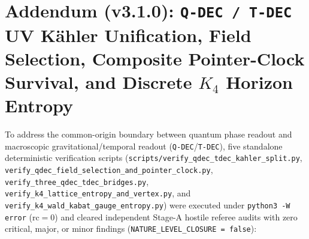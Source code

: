 \documentclass[11pt,a4paper]{article}
\begin{document}
\section{Addendum (v3.1.0): \texttt{Q-DEC / T-DEC} UV K\"ahler Unification, Field Selection, Composite Pointer-Clock Survival, and Discrete \texorpdfstring{$K_4$}{K4} Horizon Entropy}
\label{sec:v31-qdec-tdec}

To address the common-origin boundary between quantum phase readout and macroscopic gravitational/temporal readout (\texttt{Q-DEC}/\texttt{T-DEC}), five standalone deterministic verification scripts (\texttt{scripts/\allowbreak verify\_\allowbreak qdec\_\allowbreak tdec\_\allowbreak kahler\_\allowbreak split.py}, \texttt{verify\_\allowbreak qdec\_\allowbreak field\_\allowbreak selection\_\allowbreak and\_\allowbreak pointer\_\allowbreak clock.py}, \texttt{verify\_\allowbreak three\_\allowbreak qdec\_\allowbreak tdec\_\allowbreak bridges.py}, \texttt{verify\_\allowbreak k4\_\allowbreak lattice\_\allowbreak entropy\_\allowbreak and\_\allowbreak vertex.py}, and \texttt{verify\_\allowbreak k4\_\allowbreak wald\_\allowbreak kabat\_\allowbreak gauge\_\allowbreak entropy.py}) were executed under \texttt{python3 -W error} ($\mathrm{rc}=0$) and cleared independent Stage-A hostile referee audits with zero critical, major, or minor findings (\texttt{NATURE\_LEVEL\_CLOSURE = false}):
\end{document}

